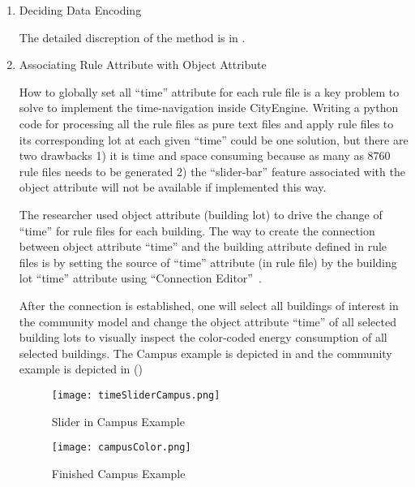 \begin{enumerate}[1)]
\item{Deciding Data Encoding}

  The detailed discreption of the method is in .

\item{Associating Rule Attribute with Object Attribute} 

  How to globally set all ``time'' attribute for each rule file is a
  key problem to solve to implement the time-navigation inside
  CityEngine. Writing a python code for processing all the rule files
  as pure text files and apply rule files to its corresponding lot at
  each given ``time'' could be one solution, but there are two
  drawbacks 1) it is time and space consuming because as many as 8760
  rule files needs to be generated 2) the ``slider-bar'' feature
  associated with the object attribute will not be available if
  implemented this way.

  The researcher used object attribute (building lot) to drive the
  change of ``time'' for rule files for each building. The way to
  create the connection between object attribute ``time'' and the
  building attribute defined in rule files is by setting the source of
  ``time'' attribute (in rule file) by the building lot ``time''
  attribute using ``Connection
  Editor''~\cite{cityEngineAttConect2015}.

  After the connection is established, one will select all buildings
  of interest in the community model and change the object attribute
  ``time'' of all selected building lots to visually inspect the
  color-coded energy consumption of all selected buildings. The Campus
  example is depicted in  and the community
  example is depicted in ()

  \begin{figure}[h!]
    \centering
    \texttt{[image: timeSliderCampus.png]}
    \caption[Slider in Campus Example]{Slider in Campus Example}
    \label{fig:timeSliderCampus}
  \end{figure}
  \begin{figure}[h!]
    \centering
    \texttt{[image: campusColor.png]}
    \caption[Finished Campus Example]{Finished Campus Example}
    \label{fig:campusColor}
  \end{figure}


\end{enumerate}
